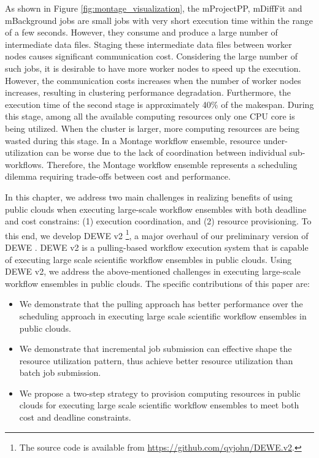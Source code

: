 As shown in Figure  \ref{fig:montage_visualization}, the mProjectPP, mDiffFit and mBackground jobs are small jobs with very short execution time within the range of a few seconds. However, they consume and produce a large number of intermediate data files. Staging these intermediate data files between worker nodes causes significant communication cost. Considering the large number of such jobs, it is desirable to have more worker nodes to speed up the execution. However, the communication costs increases when the number of worker nodes increases, resulting in clustering performance degradation. Furthermore, the execution time of the second stage is approximately 40\% of the makespan. During this stage, among all the available computing resources only one CPU core is being utilized. When the cluster is larger, more computing resources are being wasted during this stage. In a Montage workflow ensemble, resource under-utilization can be worse due to the lack of coordination between individual sub-workflows. Therefore, the Montage workflow ensemble represents a scheduling dilemma requiring trade-offs between cost and performance. 

In this chapter, we address two main challenges in realizing benefits of using public clouds when executing large-scale workflow ensembles with both deadline and cost constrains: (1) execution coordination, and (2) resource provisioning. To this end, we develop DEWE v2 \footnote{The source code is available from \url{https://github.com/qyjohn/DEWE.v2}.}, a major overhaul of our preliminary version of DEWE \cite{dewev1}. DEWE v2 is a pulling-based workflow execution system that is capable of executing large scale scientific workflow ensembles in public clouds. Using DEWE v2, we address the above-mentioned challenges in executing large-scale workflow ensembles in public clouds. The specific contributions of this paper are:


\begin{itemize}
  \item We demonstrate that the pulling approach has better performance over the scheduling approach in executing large scale scientific workflow ensembles in public clouds. 
  \item We demonstrate that incremental job submission can effective shape the resource utilization pattern, thus achieve better resource utilization than batch job submission. 
  \item We propose a two-step strategy to provision computing resources in public clouds for executing large scale scientific workflow ensembles to meet both cost and deadline constraints. 
\end{itemize}

